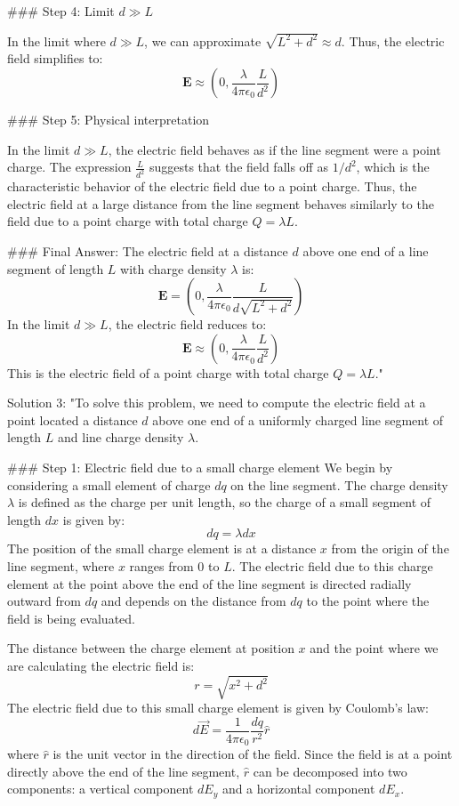 ### Step 4: Limit \( d \gg L \)

In the limit where \( d \gg L \), we can approximate \( \sqrt{L^2 + d^2} \approx d \). Thus, the electric field simplifies to:
\[
\mathbf{E} \approx \left( 0, \frac{\lambda}{4\pi \epsilon_0} \frac{L}{d^2} \right)
\]

### Step 5: Physical interpretation

In the limit \( d \gg L \), the electric field behaves as if the line segment were a point charge. The expression \( \frac{L}{d^2} \) suggests that the field falls off as \( 1/d^2 \), which is the characteristic behavior of the electric field due to a point charge. Thus, the electric field at a large distance from the line segment behaves similarly to the field due to a point charge with total charge \( Q = \lambda L \).

### Final Answer:
The electric field at a distance \( d \) above one end of a line segment of length \( L \) with charge density \( \lambda \) is:
\[
\mathbf{E} = \left( 0, \frac{\lambda}{4\pi \epsilon_0} \frac{L}{d \sqrt{L^2 + d^2}} \right)
\]
In the limit \( d \gg L \), the electric field reduces to:
\[
\mathbf{E} \approx \left( 0, \frac{\lambda}{4\pi \epsilon_0} \frac{L}{d^2} \right)
\]
This is the electric field of a point charge with total charge \( Q = \lambda L \)."

Solution 3:
"To solve this problem, we need to compute the electric field at a point located a distance \( d \) above one end of a uniformly charged line segment of length \( L \) and line charge density \( \lambda \).

### Step 1: Electric field due to a small charge element
We begin by considering a small element of charge \( dq \) on the line segment. The charge density \( \lambda \) is defined as the charge per unit length, so the charge of a small segment of length \( dx \) is given by:
\[
dq = \lambda dx
\]
The position of the small charge element is at a distance \( x \) from the origin of the line segment, where \( x \) ranges from 0 to \( L \). The electric field due to this charge element at the point above the end of the line segment is directed radially outward from \( dq \) and depends on the distance from \( dq \) to the point where the field is being evaluated.

The distance between the charge element at position \( x \) and the point where we are calculating the electric field is:
\[
r = \sqrt{x^2 + d^2}
\]
The electric field due to this small charge element is given by Coulomb's law:
\[
d\vec{E} = \frac{1}{4 \pi \epsilon_0} \frac{dq}{r^2} \hat{r}
\]
where \( \hat{r} \) is the unit vector in the direction of the field. Since the field is at a point directly above the end of the line segment, \( \hat{r} \) can be decomposed into two components: a vertical component \( dE_y \) and a horizontal component \( dE_x \).

